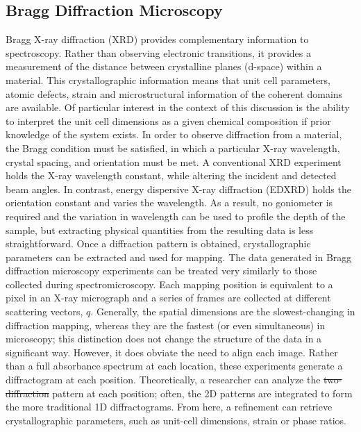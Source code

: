 \documentclass[journal=cmatex,manuscript=perspective]{achemso}
\providecommand{\DIFaddtex}[1]{{\protect\color{blue}\uwave{#1}}} %
\providecommand{\DIFdeltex}[1]{{\protect\color{red}\sout{#1}}}                      %
\providecommand{\DIFaddbegin}{} %
\providecommand{\DIFaddend}{} %
\providecommand{\DIFdelbegin}{} %
\providecommand{\DIFdelend}{} %
\providecommand{\DIFadd}[1]{\texorpdfstring{\DIFaddtex{#1}}{#1}} %
\providecommand{\DIFdel}[1]{\texorpdfstring{\DIFdeltex{#1}}{}} %
\begin{document}
\subsection{Bragg Diffraction Microscopy}

Bragg X-ray diffraction (XRD) provides complementary information to
spectroscopy. Rather than observing electronic transitions, it
provides a measurement of the distance between crystalline planes
(d-space) within a material. This crystallographic information means
that unit cell parameters, atomic defects, strain and microstructural
information of the coherent domains are available. Of particular
interest in the context of this discussion is the ability to interpret
the unit cell dimensions as a given chemical composition if prior
knowledge of the system exists. In order to observe diffraction from a
material, the Bragg condition must be satisfied, in which a particular
X-ray wavelength, crystal spacing, and orientation must be met. A
conventional XRD experiment holds the X-ray wavelength constant, while
altering the incident and detected beam angles. In contrast, energy
dispersive X-ray diffraction (EDXRD) holds the orientation constant
and varies the wavelength. As a result, no goniometer is required and
the variation in wavelength can be used to profile the depth of the
sample, but extracting physical quantities from the resulting data is
less straightforward\cite{michel2005,strobridge2015}. Once a
diffraction pattern is obtained, crystallographic parameters can be
extracted and used for mapping. The data generated in Bragg
diffraction microscopy experiments can be treated very similarly to
those collected during spectromicroscopy. Each mapping position is
equivalent to a pixel in an X-ray micrograph and a series of frames
are collected at different scattering vectors, $q$. Generally, the
spatial dimensions are the slowest-changing in diffraction mapping,
whereas they are the fastest (or even simultaneous) in microscopy;
this distinction does not change the structure of the data in a
significant way. However, it does obviate the need to align each
image. Rather than a full absorbance spectrum at each location, these
experiments generate a diffractogram at each position. Theoretically,
a researcher can analyze the \DIFdelbegin \DIFdel{two-diffraction }\DIFdelend \DIFaddbegin \DIFadd{two-dimensional diffraction }\DIFaddend pattern at
each position; often, the 2D patterns are integrated to form the more
traditional 1D diffractograms. From here, a refinement can retrieve
crystallographic parameters, such as unit-cell dimensions, strain or
phase ratios.
\end{document}
